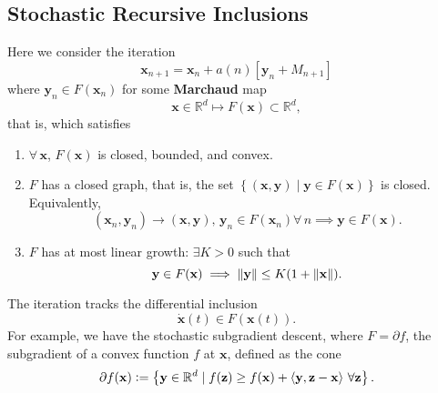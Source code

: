 \subsection{Stochastic Recursive Inclusions}

Here we consider the iteration
\[
    \mathbf{x}_{n+1} = \mathbf{x}_n + a(n) \left[ \mathbf{y}_n + M_{n+1} \right]
\]
where $\mathbf{y}_n \in F(\mathbf{x}_n)$ for some \textbf{Marchaud} map 
\[
    \mathbf{x} \in \mathbb{R}^d \mapsto F(\mathbf{x}) \subset \mathbb{R}^d,
\]  
that is, which satisfies
\begin{enumerate}
    \item $\forall \, \mathbf{x}$, $F(\mathbf{x})$ is closed, bounded, and convex. 
    \item $F$ has a closed graph, that is, the set $\left\{ (\mathbf{x},\mathbf{y}) \mid\mathbf{y} \in F(\mathbf{x}) \right\}$ is closed. Equivalently, 
    \[
        (\mathbf{x}_n, \mathbf{y}_n) \to (\mathbf{x},\mathbf{y}), \, \mathbf{y}_n \in F(\mathbf{x}_n) \forall \, n \implies \mathbf{y} \in F(\mathbf{x}). 
    \]
    \item $F$ has at most linear growth: $\exists K > 0$ such that
    \[
        \mathbf{y} \in F(\mathbf{x}) \implies \norm{\mathbf{y}} \leq K(1 + \norm{\mathbf{x}}). 
    \]
\end{enumerate}

The iteration tracks the differential inclusion
\[
    \dot{\mathbf{x}}(t) \in F(\mathbf{x}(t)).
\]
For example,  we have the stochastic subgradient descent, where $F = \partial f$, the subgradient of a convex function $f$ at $\mathbf{x}$, defined as the cone
\[
    \partial f(\mathbf{x}) \vcentcolon= \left\{ \mathbf{y} \in \mathbb{R}^d \mid f(\mathbf{z}) \geq f(\mathbf{x}) + \left\langle \mathbf{y}, \mathbf{z-x} \right\rangle \, \forall \mathbf{z} \right\}. 
\]